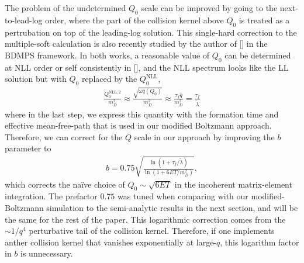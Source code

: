 \documentclass[aps, prc, reprint, amsmath, groupedaddress, nofootinbib]{revtex4-1}
\begin{document}
The problem of the undetermined $Q_0$ scale can be improved by going to the next-to-lead-log order, where the part of the collision kernel above $Q_0$ is treated as a pertrubation on top of the leading-log solution.
This single-hard correction to the multiple-soft calculation is also recently studied by the author of [] in the BDMPS framework.
In both works, a reasonable value of $Q_0$ can be determined at NLL order or self consistently in [], and the NLL spectrum looks like the LL solution but with $Q_0$ replaced by the $Q_{0}^{\textrm{NLL}}$,
\begin{eqnarray}
\frac{Q_{0}^{\textrm{NLL},2}}{m_D^2} \approx \frac{\sqrt{\omega \hat{q}(Q_0)}}{m_D^2} \approx \frac{\tau_f \hat{q}}{m_D^2} = \frac{\tau_f}{\tilde{\lambda}}
\end{eqnarray}
where in the last step, we express this quantity with the formation time and effective mean-free-path that is used in our modified Boltzmann approach.
Therefore, we can correct for the $Q$ scale in our approach by improving the $b$ parameter to 
\begin{eqnarray}
b = 0.75\sqrt{\frac{\ln\left(1+\tau_f/\tilde{\lambda}\right)}{\ln\left(1+6ET/m_D^2\right)}},
\label{eq:NLL-b}
\end{eqnarray}
which corrects the na\"ive choice of $Q_0 \sim \sqrt{6ET}$ in the incoherent matrix-element integration.
The prefactor $0.75$ was tuned when comparing with our modified-Boltzmann simulation to the semi-analytic results in the next section, and will be the same for the rest of the paper.
This logarithmic correction comes from the $\sim 1/q^4$ perturbative tail of the collision kernel.
Therefore, if one implements anther collision kernel that vanishes exponentially at large-$q$, this logarithm factor in $b$ is unnecessary. 
\end{document}
